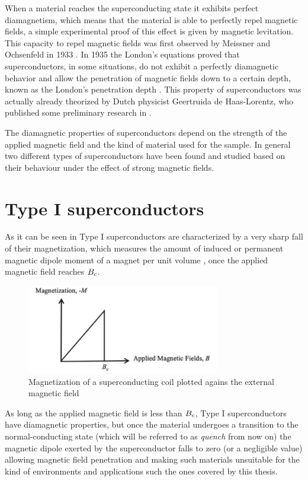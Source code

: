 When a material reaches the superconducting state it exhibits perfect diamagnetism, which means that
the material is able to perfectly repel magnetic fields, a simple experimental proof of this effect
is given by magnetic levitation. This capacity to repel magnetic fields was first observed by
Meissner and Ochsenfeld in 1933 \cite{meissner1933}. In 1935 the London's equations proved that
superconductors, in some situations, do not exhibit a perfectly diamagnetic behavior and allow the
penetration of magnetic fields down to a certain depth, known as the London's penetration depth
\cite{london1935}. This property of superconductors was actually already theorized by Dutch
physicist Geertruida de Haas-Lorentz, who published some preliminary research in
\cite{fokker1925physica}.

The diamagnetic properties of superconductors depend on the strength of the applied magnetic field
and the kind of material used for the sample. In general two different types of superconductors have
been found and studied based on their behaviour under the effect of strong magnetic fields.

\section{Type I superconductors}
\label{sec:type1}
As it can be seen in  Type I superconductors are characterized by a very
sharp fall of their magnetization, which measures the amount of induced or
permanent magnetic dipole moment of a magnet per unit volume \cite{polarization-magnetization}, once
the applied magnetic field reaches $B_c$.
\begin{figure}
	\centering
	\includegraphics[width=0.75\textwidth]{./img/type1.png}
	\caption{Magnetization of a superconducting coil plotted agains the external magnetic field
		\cite{slimani2022superconducting}}
	\label{img:type1-transition}
\end{figure}
As long as the applied magnetic field is less than $B_c$, Type I superconductors have diamagnetic
properties, but once the material undergoes a transition to the normal-conducting
state (which will be referred to as \emph{quench} from now on) the magnetic dipole exerted by the
superconductor falls to zero (or a negligible value) allowing magnetic field penetration and making such materials unsuitable for the kind of environments and applications such the ones covered by this thesis.

